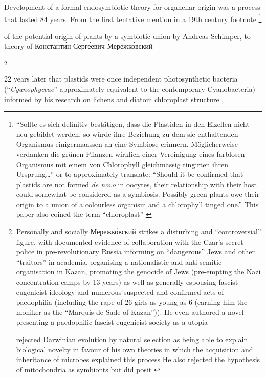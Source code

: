 Development of a formal endosymbiotic theory for organellar origin was a process that
lasted 84 years. From the first tentative mention in a 19th century footnote 
\footnote{``Sollte es sich definitiv best\"atigen, dass die Plastiden in den 
    Eizellen nicht neu gebildet werden, so w\"urde ihre Beziehung zu dem sie 
    enthaltenden Organismus einigermaassen an eine Symbiose erinnern. M\"oglicherweise
    verdanken die gr\"unen Pflanzen wirklich einer Vereinigung eines farblosen Organismus
    mit einem von Chlorophyll gleichm\"assig tingirten ihren Ursprung\ldots''
    \citep{Schimper1883} or to approximately translate: ``Should it be confirmed
    that plastids are not formed \textit{de novo} in oocytes, their relationship with
    their host could somewhat be considered as a symbiosis.  Possibly green plants owe
    their origin to a union of a colourless organism and a chlorophyll tinged one.'' 
    This paper also coined the term ``chloroplast'' \citep{Sapp2002}} 

of the potential origin of plants by a symbiotic union by Andreas Schimper, 
to theory of Константи́н Серге́евич Мережко́вский 

\footnote{Personally and socially Мережко́вский strikes a disturbing and 
    ``controversial'' figure, with documented evidence of collaboration with
    the Czar's secret police in pre-revolutionary Russia informing on ``dangerous''
    Jews and other ``traitors'' in academia, organising a nationalistic
    and anti-semitic organisation in Kazan, promoting the genocide of Jews
    (pre-empting the Nazi concentration camps by 13 years) as well as generally
    espousing fascist-eugenicist ideology and numerous suspected and 
    confirmed acts of paedophilia (including the rape of 26 girls as young as 6 
    (earning him the moniker as the ``Marquis de Sade of Kazan'')).  
    He even authored a novel presenting a paedophilic fascist-eugenicist 
    society as a utopia
    
    rejected Darwinian evolution by natural 
    selection as being able to explain biological novelty
    in favour of his own theories in which the acquisition and inheritance of microbes
    explained this process 
    He also rejected the hypothesis of mitochondria as symbionts but did posit
    \citep{Sapp2002}}


22 years later that plastids were once independent photosynthetic bacteria 
(``\textit{Cyanophyceae}'' approximately equivalent to the contemporary Cyanobacteria) 
informed by his research on lichens \citep{Mereschkowsky1905,Martin1999a} and diatom chloroplast
structure \citep{Sapp2002}, 

